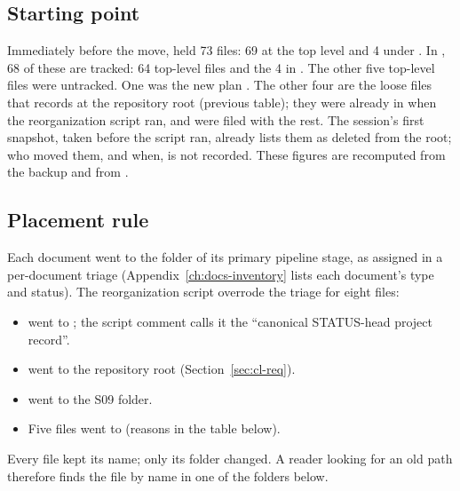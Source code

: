 \subsection{Starting point}
Immediately before the move,  held 73 files: 69 at the top level and 4 under . In , 68 of these are tracked: 64 top-level files and the 4 in . The other five top-level files were untracked. One was the new plan . The other four are the loose files that  records at the repository root (previous table); they were already in  when the reorganization script ran, and were filed with the rest. The session's first  snapshot, taken before the script ran, already lists them as deleted from the root; who moved them, and when, is not recorded. These figures are recomputed from the backup and from .

\subsection{Placement rule}
Each document went to the folder of its primary pipeline stage, as assigned in a per-document triage (Appendix~\ref{ch:docs-inventory} lists each document's type and status). The reorganization script overrode the triage for eight files:
\begin{itemize}
  \item {} went to ; the script comment calls it the ``canonical STATUS-head project record''.
  \item {} went to the repository root (Section~\ref{sec:cl-req}).
  \item {} went to the S09 folder.
  \item Five files went to  (reasons in the table below).
\end{itemize}
Every file kept its name; only its folder changed. A reader looking for an old path  therefore finds the file by name in one of the folders below.

